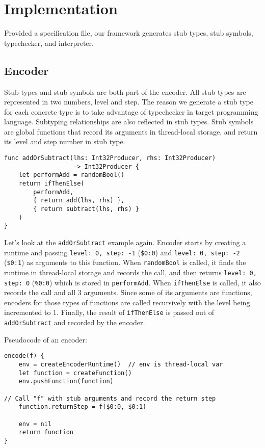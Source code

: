 \documentclass[12pt]{article}
\begin{document}
\section{Implementation}
Provided a specification file, our framework generates stub types, stub symbols, typechecker, and interpreter.

\subsection{Encoder}
Stub types and stub symbols are both part of the encoder. All stub types are represented in two numbers, level and step. The reason we generate a stub type for each concrete type is to take advantage of typechecker in target programming language. Subtyping relationships are also reflected in stub types. Stub symbols are global functions that record its arguments in thread-local storage, and return its level and step number in stub type.
\begin{lstlisting}
func addOrSubtract(lhs: Int32Producer, rhs: Int32Producer)
                   -> Int32Producer {
    let performAdd = randomBool()
    return ifThenElse(
        performAdd,
        { return add(lhs, rhs) },
        { return subtract(lhs, rhs) }
    )
}
\end{lstlisting}
Let's look at the \texttt{addOrSubtract} example again. Encoder starts by creating a runtime and passing \texttt{level: 0, step: -1} (\texttt{\$0:0}) and \texttt{level: 0, step: -2} (\texttt{\$0:1}) as arguments to this function. When \texttt{randomBool} is called, it finds the runtime in thread-local storage and records the call, and then returns \texttt{level: 0, step: 0} (\texttt{\%0:0}) which is stored in \texttt{performAdd}. When \texttt{ifThenElse} is called, it also records the call and all 3 arguments. Since some of its arguments are functions, encoders for those types of functions are called recursively with the level being incremented to 1. Finally, the result of \texttt{ifThenElse} is passed out of \texttt{addOrSubtract} and recorded by the encoder.

Pseudocode of an encoder:
\begin{lstlisting}
encode(f) {
    env = createEncoderRuntime()  // env is thread-local var
    let function = createFunction()
    env.pushFunction(function)

// Call "f" with stub arguments and record the return step
    function.returnStep = f($0:0, $0:1)

    env = nil
    return function
}
\end{lstlisting}
\end{document}
